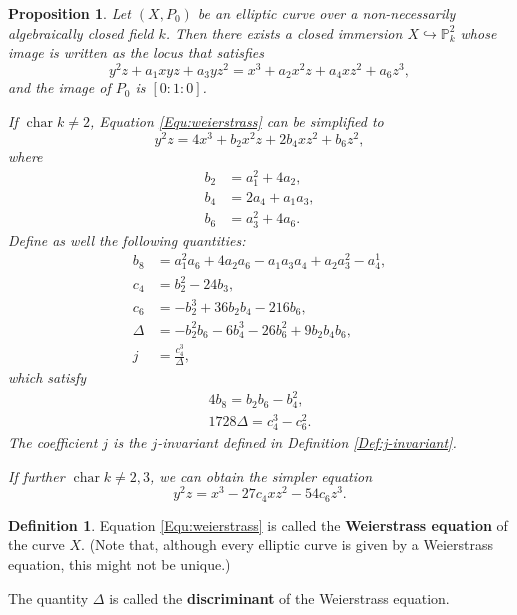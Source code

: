 \documentclass{report}
\DeclareMathOperator{\chara}{char}
\newtheorem{proposition}[theorem]{Proposition}
\theoremstyle{definition}
\newtheorem{definition}[theorem]{Definition}
\begin{document}
\begin{proposition}
Let $(X,P_0)$ be an elliptic curve over a non-necessarily algebraically closed field $k$. Then there exists a closed immersion $X\hookrightarrow\mathbb{P}_k^2$ whose image is written as the locus that satisfies
\begin{equation}
\label{Equ:weierstrass}
y^2z+a_1xyz+a_3yz^2=x^3+a_2x^2z+a_4xz^2+a_6z^3,
\end{equation}
and the image of $P_0$ is $[0:1:0]$.

If $\chara k\neq2$, Equation \eqref{Equ:weierstrass} can be simplified to
\[y^2z=4x^3+b_2x^2z+2b_4xz^2+b_6z^2,\]
where
\begin{align*}
b_2&=a_1^2+4a_2,\\
b_4&=2a_4+a_1a_3,\\
b_6&=a_3^2+4a_6.
\end{align*}
Define as well the following quantities:
\begin{align*}
b_8&=a_1^2a_6+4a_2a_6-a_1a_3a_4+a_2a_3^2-a_4^1,\\
c_4&=b_2^2-24b_3,\\
c_6&=-b_2^3+36b_2b_4-216b_6,\\
\Delta&=-b_2^2b_6-6b_4^3-26b_6^2+9b_2b_4b_6,\\
j&=\frac{c_4^3}{\Delta},
\end{align*}
which satisfy
\begin{align*}
4b_8=b_2b_6-b_4^2,\\
1728\Delta=c_4^3-c_6^2.
\end{align*}
The coefficient $j$ is the $j$-invariant defined in Definition \ref{Def:j-invariant}.

If further $\chara k\neq2,3$, we can obtain the simpler equation
\begin{equation}
\label{Equ:Weierstrass-simple}
y^2z=x^3-27c_4xz^2-54c_6z^3.
\end{equation}
\end{proposition}

\begin{definition}
Equation \eqref{Equ:weierstrass} is called the \textbf{Weierstrass equation} of the curve $X$. (Note that, although every elliptic curve is given by a Weierstrass equation, this might not be unique.)

The quantity $\Delta$ is called the \textbf{discriminant} of the Weierstrass equation.
\end{definition}
\end{document}
